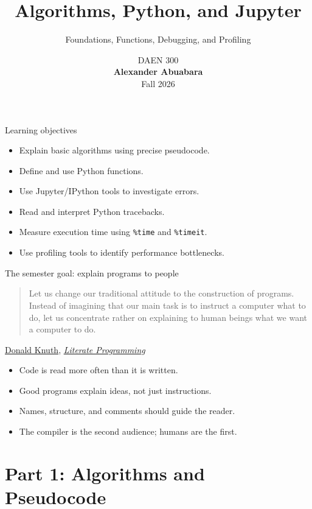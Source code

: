 \documentclass[11pt,aspectratio=43]{beamer}
\title{Algorithms, Python, and Jupyter}
\subtitle{Foundations, Functions, Debugging, and Profiling}
\author{}
\date{\textcolor{aggiemaroon}{DAEN 300\\ \textbf{Alexander Abuabara}\\ Fall 2026}}
\begin{document}
\begin{frame}
  \titlepage
\end{frame}

\begin{frame}{Learning objectives}
\begin{itemize}
  \item Explain basic algorithms using precise pseudocode.
  \item Define and use Python functions.
  \item Use Jupyter/IPython tools to investigate errors.
  \item Read and interpret Python tracebacks.
  \item Measure execution time using \texttt{\%time} and \texttt{\%timeit}.
  \item Use profiling tools to identify performance bottlenecks.
\end{itemize}
\end{frame}

\begin{frame}{The semester goal: explain programs to people}
\large
\begin{quote}
Let us change our traditional attitude to the construction of programs.
Instead of imagining that our main task is to instruct a computer what to do,
let us concentrate rather on explaining to human beings what we want a computer to do.
\end{quote}

\hfill
\href{https://en.wikipedia.org/wiki/Donald_Knuth}{Donald Knuth},
\href{https://en.wikipedia.org/wiki/Literate_programming}{\emph{Literate Programming}}

\vspace{0.6cm}
\begin{itemize}
  \item Code is read more often than it is written.
  \item Good programs explain ideas, not just instructions.
  \item Names, structure, and comments should guide the reader.
  \item The compiler is the second audience; humans are the first.
\end{itemize}
\end{frame}

\section{Part 1: Algorithms and Pseudocode}
\end{document}
